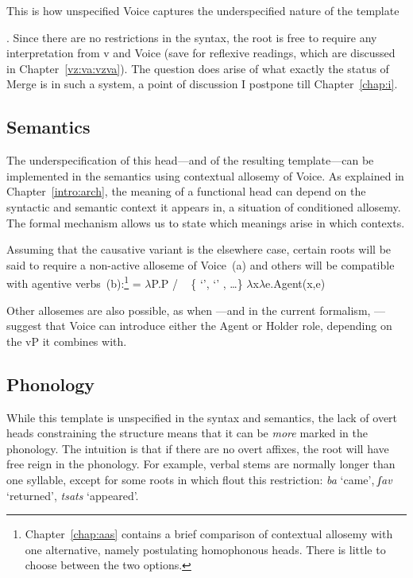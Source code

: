 This is how unspecified Voice captures the underspecified nature of the template {\tkal. Since there are no restrictions in the syntax, the root is free to require any interpretation from v and Voice (save for reflexive readings, which are discussed in Chapter~\ref{vz:va:vzva}). The question does arise of what exactly the status of Merge is in such a system, a point of discussion I postpone till Chapter~\ref{chap:i}.

		
		\subsection{Semantics} \label{voice:voice:sem}
The underspecification of this head---and of the resulting template---can be implemented in the semantics using contextual allosemy of Voice. As explained in Chapter~\ref{intro:arch}, the meaning of a functional head can depend on the syntactic and semantic context it appears in, a situation of conditioned allosemy. The formal mechanism allows us to state which meanings arise in which contexts.

Assuming that the causative variant is the elsewhere case, certain roots will be said to require a non-active alloseme of Voice~(\nextx a) and others will be compatible with agentive verbs~(\nextx b):\footnote{Chapter~\ref{chap:aas} contains a brief comparison of contextual allosemy with one alternative, namely postulating homophonous heads. There is little to choose between the two options.}
\pex {} = 
	\a $\lambda$P.P \phantom{agent(x,e)xxx} / \trace~ \{  `',  `' , \dots \}
	\a $\lambda$x$\lambda$e.Agent(x,e)
\xe

Other allosemes are also possible, as when \cite{kratzer96}---and in the current formalism, \cite{woodmarantz17}---suggest that Voice can introduce either the Agent or Holder role, depending on the vP it combines with.
		
		\subsection{Phonology} \label{voice:voice:phono}
While this template is unspecified in the syntax and semantics, the lack of overt heads constraining the structure means that it can be \emph{more} marked in the phonology. The intuition is that if there are no overt affixes, the root will have free reign in the phonology. For example, verbal stems are normally longer than one syllable, except for some roots in {\tkal} which flout this restriction:
\ex \emph{ba} `came', \emph{ʃav} `returned', \emph{tsats} `appeared'.
\xe

}
